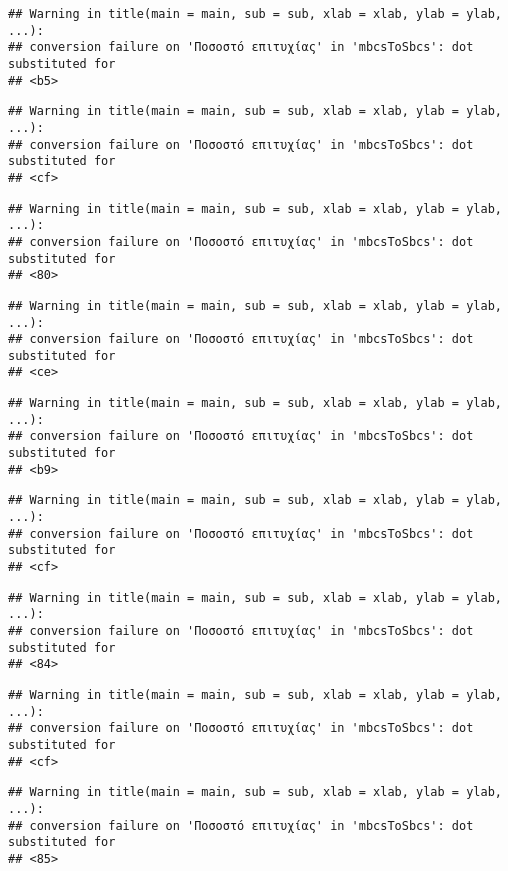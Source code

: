 \documentclass[
]{article}
\begin{document}
\begin{verbatim}
## Warning in title(main = main, sub = sub, xlab = xlab, ylab = ylab, ...):
## conversion failure on 'Ποσοστό επιτυχίας' in 'mbcsToSbcs': dot substituted for
## <b5>
\end{verbatim}

\begin{verbatim}
## Warning in title(main = main, sub = sub, xlab = xlab, ylab = ylab, ...):
## conversion failure on 'Ποσοστό επιτυχίας' in 'mbcsToSbcs': dot substituted for
## <cf>
\end{verbatim}

\begin{verbatim}
## Warning in title(main = main, sub = sub, xlab = xlab, ylab = ylab, ...):
## conversion failure on 'Ποσοστό επιτυχίας' in 'mbcsToSbcs': dot substituted for
## <80>
\end{verbatim}

\begin{verbatim}
## Warning in title(main = main, sub = sub, xlab = xlab, ylab = ylab, ...):
## conversion failure on 'Ποσοστό επιτυχίας' in 'mbcsToSbcs': dot substituted for
## <ce>
\end{verbatim}

\begin{verbatim}
## Warning in title(main = main, sub = sub, xlab = xlab, ylab = ylab, ...):
## conversion failure on 'Ποσοστό επιτυχίας' in 'mbcsToSbcs': dot substituted for
## <b9>
\end{verbatim}

\begin{verbatim}
## Warning in title(main = main, sub = sub, xlab = xlab, ylab = ylab, ...):
## conversion failure on 'Ποσοστό επιτυχίας' in 'mbcsToSbcs': dot substituted for
## <cf>
\end{verbatim}

\begin{verbatim}
## Warning in title(main = main, sub = sub, xlab = xlab, ylab = ylab, ...):
## conversion failure on 'Ποσοστό επιτυχίας' in 'mbcsToSbcs': dot substituted for
## <84>
\end{verbatim}

\begin{verbatim}
## Warning in title(main = main, sub = sub, xlab = xlab, ylab = ylab, ...):
## conversion failure on 'Ποσοστό επιτυχίας' in 'mbcsToSbcs': dot substituted for
## <cf>
\end{verbatim}

\begin{verbatim}
## Warning in title(main = main, sub = sub, xlab = xlab, ylab = ylab, ...):
## conversion failure on 'Ποσοστό επιτυχίας' in 'mbcsToSbcs': dot substituted for
## <85>
\end{verbatim}
\end{document}
